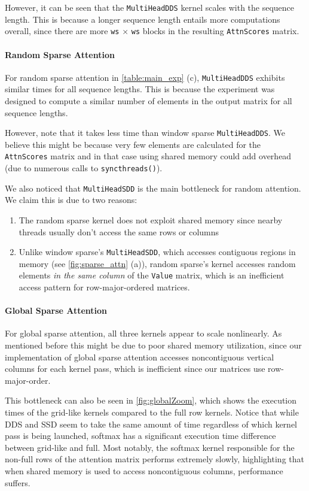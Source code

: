 \documentclass[11pt]{article}
\begin{document}
However, it can be seen that the \texttt{MultiHeadDDS} kernel scales with the sequence length. This is because a longer sequence length entails more computations overall, since there are more \texttt{ws} $\times$ \texttt{ws} blocks in the resulting \texttt{AttnScores} matrix.

\paragraph{Random Sparse Attention} For random sparse attention in \autoref{table:main_exp} (c), \texttt{MultiHeadDDS} exhibits similar times for all sequence lengths. This is because the experiment was designed to compute a similar number of elements in the output matrix for all sequence lengths. 


However, note that it takes less time than window sparse \texttt{MultiHeadDDS}. We believe this might be because very few elements are calculated for the \texttt{AttnScores} matrix and in that case using shared memory could add overhead (due to numerous calls to \texttt{syncthreads()}).

We also noticed that \texttt{MultiHeadSDD} is the main bottleneck for random attention. 
We claim this is due to two reasons:
\begin{enumerate}
    \item The random sparse kernel does not exploit shared memory since nearby threads usually don't access the same rows or columns
    \item Unlike window sparse's \texttt{MultiHeadSDD}, which accesses contiguous regions in memory (see \autoref{fig:sparse_attn} (a)), random sparse's kernel accesses random elements \textit{in the same column} of the \texttt{Value} matrix, which is an inefficient access pattern for row-major-ordered matrices.
\end{enumerate}
\paragraph{Global Sparse Attention}
For global sparse attention, all three kernels appear to scale nonlinearly. As mentioned before this might be due to poor shared memory utilization, since our implementation of global sparse attention accesses noncontiguous vertical columns for each kernel pass, which is inefficient since our matrices use row-major-order. 

This bottleneck can also be seen in \autoref{fig:globalZoom}, which shows the execution times of the grid-like kernels compared to the full row kernels. Notice that while DDS and SSD seem to take the same amount of time regardless of which kernel pass is being launched, softmax has a significant execution time difference between grid-like and full. Most notably, the softmax kernel responsible for the non-full rows of the attention matrix performs extremely slowly, highlighting that when shared memory is used to access noncontiguous columns, performance suffers.
\end{document}
